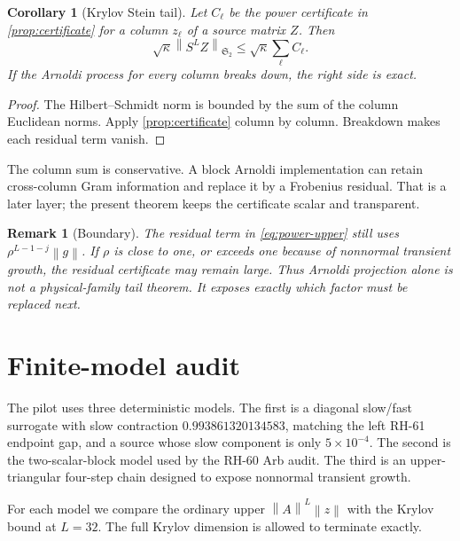 \documentclass[11pt]{article}
\newtheorem{corollary}[theorem]{Corollary}
\newtheorem{remark}[theorem]{Remark}
\newcommand{\norm}[1]{\left\lVert#1\right\rVert}
\newcommand{\HS}{\mathfrak S_2}
\begin{document}
\begin{corollary}[Krylov Stein tail]
\label{cor:krylov-stein}
Let $C_\ell$ be the power certificate in \cref{prop:certificate} for a
column $z_\ell$ of a source matrix $Z$.  Then
\begin{equation}
 \sqrt{\kappa}\norm{S^LZ}_{\HS}
 \le \sqrt{\kappa}\sum_\ell C_\ell.
\label{eq:columnwise}
\end{equation}
If the Arnoldi process for every column breaks down, the right side is
exact.
\end{corollary}

\begin{proof}
The Hilbert--Schmidt norm is bounded by the sum of the column Euclidean
norms.  Apply \cref{prop:certificate} column by column.  Breakdown makes
each residual term vanish.
\end{proof}

The column sum is conservative.  A block Arnoldi implementation can retain
cross-column Gram information and replace it by a Frobenius residual.  That
is a later layer; the present theorem keeps the certificate scalar and
transparent.

\begin{remark}[Boundary]
\label{rem:boundary}
The residual term in \eqref{eq:power-upper} still uses $\rho^{L-1-j}\norm g$.
If $\rho$ is close to one, or exceeds one because of nonnormal transient
growth, the residual certificate may remain large.  Thus Arnoldi projection
alone is not a physical-family tail theorem.  It exposes exactly which
factor must be replaced next.
\end{remark}

\section{Finite-model audit}
\label{sec:audit}

The pilot uses three deterministic models.  The first is a diagonal
slow/fast surrogate with slow contraction
$0.993861320134583$, matching the left RH-61 endpoint gap, and a source
whose slow component is only $5\times10^{-4}$.  The second is the
two-scalar-block model used by the RH-60 Arb audit.  The third is an
upper-triangular four-step chain designed to expose nonnormal transient
growth.

For each model we compare the ordinary upper
$\norm A^L\norm z$ with the Krylov bound at $L=32$.  The full Krylov
dimension is allowed to terminate exactly.
\end{document}
